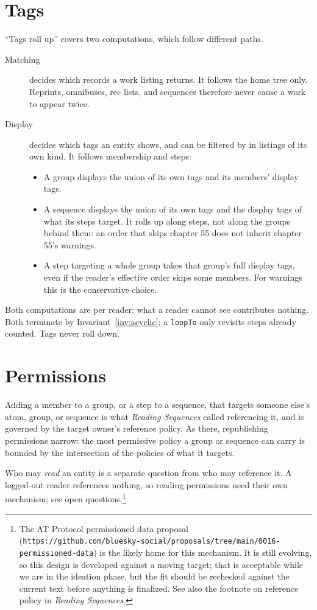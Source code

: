 \documentclass{amsart}
\theoremstyle{remark}
\begin{document}
\section{Tags}
``Tags roll up'' covers two computations, which follow different paths.
\begin{description}
  \item[Matching] decides which records a work listing returns. It follows the home tree only. Reprints, omnibuses, rec lists, and sequences therefore never cause a work to appear twice.
  \item[Display] decides which tags an entity shows, and can be filtered by in listings of its own kind. It follows membership and steps:
  \begin{itemize}
    \item A group displays the union of its own tags and its members' display tags.
    \item A sequence displays the union of its own tags and the display tags of what its steps target. It rolls up along steps, not along the groups behind them: an order that skips chapter 55 does not inherit chapter 55's warnings.
    \item A step targeting a whole group takes that group's full display tags, even if the reader's effective order skips some members. For warnings this is the conservative choice.
  \end{itemize}
\end{description}
Both computations are per reader: what a reader cannot see contributes nothing. Both terminate by Invariant~\ref{inv:acyclic}; a \lstinline|loopTo| only revisits steps already counted. Tags never roll down.

\section{Permissions}
Adding a member to a group, or a step to a sequence, that targets someone else's atom, group, or sequence is what \emph{Reading Sequences} called referencing it, and is governed by the target owner's reference policy. As there, republishing permissions narrow: the most permissive policy a group or sequence can carry is bounded by the intersection of the policies of what it targets.

Who may \emph{read} an entity is a separate question from who may reference it. A logged-out reader references nothing, so reading permissions need their own mechanism; see open questions.\footnote{The AT Protocol permissioned data proposal (\texttt{https://github.com/bluesky-social/proposals/tree/main/0016-permissioned-data}) is the likely home for this mechanism. It is still evolving, so this design is developed against a moving target; that is acceptable while we are in the ideation phase, but the fit should be rechecked against the current text before anything is finalized. See also the footnote on reference policy in \emph{Reading Sequences}.}
\end{document}
